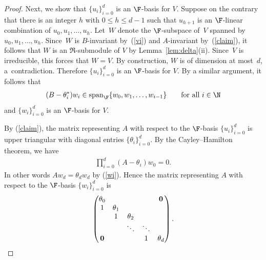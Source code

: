 \begin{proof}
Next, we show that $\{u_i\}_{i=0}^d$ is an $\F$-basis for $V$. Suppose on the contrary that there is an integer $h$ with $0\leq h\leq d-1$ such that $u_{h+1}$ is an $\F$-linear combination of $u_0,u_1,\ldots,u_h$. Let~$W$ denote the $\F$-subspace of~$V$ spanned by $u_0,u_1,\ldots,u_h$.
Since~$W$ is $B$-invariant by~(\ref{vi}) and $A$-invariant by~(\ref{claim}), it follows that $W$ is an $\Re$-submodule of $V$ by Lemma~\ref{lem:delta}(ii). Since~$V$ is irreducible, this forces that $W=V$.
By construction, $W$ is of dimension at most~$d$, a~contradiction. Therefore $\{u_i\}_{i=0}^d$ is an $\F$-basis for $V$.
By a similar argument, it follows that
\begin{gather}\label{claim'}
(B-\theta_i^*) w_i\in \operatorname{span}_\F\{w_0,w_1,\ldots,w_{i-1}\}\qquad \hbox{for all $i\in \N$}
\end{gather}
and $\{w_i\}_{i=0}^d$ is an $\F$-basis for $V$.

By (\ref{claim}), the matrix representing $A$ with respect to the $\F$-basis $\{u_i\}_{i=0}^d$ is upper triangular with diagonal entries $\{\theta_i\}_{i=0}^d$. By the Cayley--Hamilton theorem, we have
\begin{gather}\label{CH}
\prod\limits_{i=0}^d (A-\theta_i) w_0=0.
\end{gather}
In other words $Aw_d=\theta_d w_d$ by (\ref{wi}). Hence the matrix representing $A$ with respect to the $\F$-basis $\{w_i\}_{i=0}^d$ is
\begin{gather*}
\begin{pmatrix}
\theta_0 & & & &{\bf 0}
\\
1 &\theta_1
\\
&1 &\theta_2
 \\
& &\ddots &\ddots
 \\
{\bf 0} & & &1 &\theta_d
\end{pmatrix}.
\end{gather*}


\end{proof}
